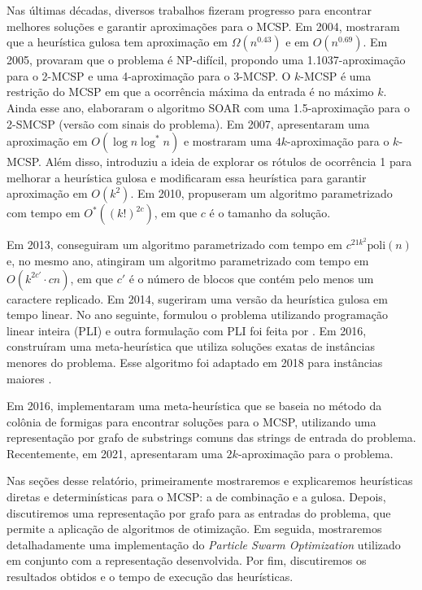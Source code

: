 Nas últimas décadas, diversos trabalhos fizeram progresso para encontrar melhores soluções e garantir aproximações para o MCSP. Em 2004, \textcite{chrobak_greedy_2004} mostraram que a heurística gulosa tem aproximação em $\Omega(n^{0.43})$ e em $O(n^{0.69})$. Em 2005, \textcite{goldstein_minimum_2005} provaram que o problema é NP-difícil, propondo uma 1.1037-aproximação para o 2-MCSP e uma 4-aproximação para o 3-MCSP. O $k$-MCSP é uma restrição do MCSP em que a ocorrência máxima da entrada é no máximo $k$. Ainda esse ano, \textcite{chen_assignment_2005} elaboraram o algoritmo SOAR com uma 1.5-aproximação para o 2-SMCSP (versão com sinais do problema). Em 2007, \textcite{cormode_string_2007} apresentaram uma aproximação em $O(\log n \log^* n)$ e \textcite{kolman_reversal_2007} mostraram uma $4k$-aproximação para o $k$-MCSP. Além disso, \textcite{mandoiu_novel_2007} introduziu a ideia de explorar os rótulos de ocorrência 1 para melhorar a heurística gulosa e \textcite{kolman_approximating_2007} modificaram essa heurística para garantir aproximação em $O(k^2)$. Em 2010, \textcite{jiang_minimum_2012} propuseram um algoritmo parametrizado com tempo em $O^*((k!)^{2c})$, em que $c$ é o tamanho da solução.

Em 2013, \textcite{bulteau_minimum_2014} conseguiram um algoritmo parametrizado com tempo em $c^{21k^2} \text{poli}(n)$ e, no mesmo ano, \textcite{bulteau_fixed-parameter_2013} atingiram um algoritmo parametrizado com tempo em $O(k^{2c'} \cdot cn)$, em que $c'$ é o número de blocos que contém pelo menos um caractere replicado. Em 2014, \textcite{goldstein_quick_2014} sugeriram uma versão da heurística gulosa em tempo linear. No ano seguinte, \textcite{blum_mathematical_2015} formulou o problema utilizando programação linear inteira (PLI) e outra formulação com PLI foi feita por \textcite{blum_computational_2016}. Em 2016, \textcite{blum_construct_2016} construíram uma meta-heurística que utiliza soluções exatas de instâncias menores do problema. Esse algoritmo foi adaptado em 2018 para instâncias maiores \cite{blum_minimum_2018}.

Em 2016, \textcite{ferdous_solving_2017} implementaram uma meta-heurística que se baseia no método da colônia de formigas para encontrar soluções para o MCSP, utilizando uma representação por grafo de substrings comuns das strings de entrada do problema. Recentemente, em 2021, \textcite{siqueira_signed_2023} apresentaram uma $2k$-aproximação para o problema.

Nas seções desse relatório, primeiramente mostraremos e explicaremos heurísticas diretas e determinísticas para o MCSP: a de combinação e a gulosa. Depois, discutiremos uma representação por grafo para as entradas do problema, que permite a aplicação de algoritmos de otimização. Em seguida, mostraremos detalhadamente uma implementação do \textit{Particle Swarm Optimization} utilizado em conjunto com a representação desenvolvida. Por fim, discutiremos os resultados obtidos e o tempo de execução das heurísticas.
